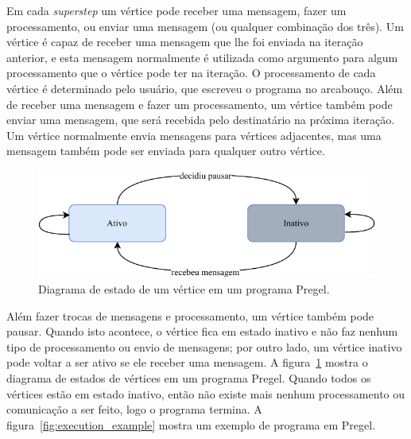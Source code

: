 \documentclass[conference]{IEEEtran}
\begin{document}
Em cada {\em superstep} um vértice pode receber uma mensagem, fazer um
processamento, ou enviar uma mensagem (ou qualquer combinação dos três).
Um vértice é capaz de receber uma mensagem que lhe foi enviada na
iteração anterior, e esta mensagem normalmente é utilizada como
argumento para algum processamento que o vértice pode ter na iteração. O
processamento de cada vértice é determinado pelo usuário, que escreveu o
programa no arcabouço. Além de receber uma mensagem e fazer um
processamento, um vértice também pode enviar uma mensagem, que será
recebida pelo destinatário na próxima iteração. Um vértice normalmente
envia mensagens para vértices adjacentes, mas uma mensagem também pode
ser enviada para qualquer outro vértice.

\begin{figure}
    \begin{center}
        \includegraphics[width=.45\textwidth]{pregel/vertex_state.pdf}
    \end{center}
    \caption{Diagrama de estado de um vértice em um programa Pregel.}
    \label{fig:pregel_states}
\end{figure}

Além fazer trocas de mensagens e processamento, um vértice também pode
pausar. Quando isto acontece, o vértice fica em estado inativo e não faz
nenhum tipo de processamento ou envio de mensagens; por outro lado, um
vértice inativo pode voltar a ser ativo se ele receber uma mensagem. A
figura~\ref{fig:pregel_states} mostra o diagrama de estados de vértices
em um programa Pregel.  Quando todos os vértices estão em estado
inativo, então não existe mais nenhum processamento ou comunicação a ser
feito, logo o programa termina. A figura~\ref{fig:execution_example}
mostra um exemplo de programa em Pregel.
\end{document}
